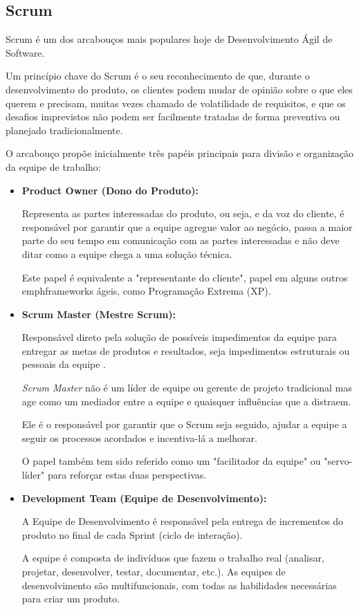 \subsection{Scrum}
\par Scrum é um dos arcabouços mais populares hoje de Desenvolvimento Ágil de Software. 
\par Um princípio chave do Scrum é o seu reconhecimento de que, durante o desenvolvimento do produto, os clientes podem mudar de opinião sobre o que eles querem e precisam, muitas vezes chamado de volatilidade de requisitos, e que os desafios imprevistos não podem ser facilmente tratadas de forma preventiva ou planejado tradicionalmente.
\par O arcabouço propõe inicialmente três papéis principais para divisão e organização da equipe de trabalho:
\begin{itemize}
\item\textbf{Product Owner (Dono do Produto):}
\par Representa as partes interessadas do produto, ou seja, e da voz do cliente, é responsável por garantir que a equipe agregue valor ao negócio, passa a maior parte do seu tempo em comunicação com as partes interessadas e não deve ditar como a equipe chega a uma solução técnica. 
\par Este papel é equivalente a "representante do cliente", papel em alguns outros emph{frameworks} ágeis, como Programação Extrema (XP).
\item\textbf{Scrum Master (Mestre Scrum):}
\par Responsável direto pela solução de possíveis impedimentos da equipe para entregar as metas de produtos e resultados, seja impedimentos estruturais ou pessoais da equipe . 
\par \emph{Scrum Master} não é um líder de equipe ou gerente de projeto tradicional mas age como um mediador entre a equipe e quaisquer influências que a distraem. 
\par Ele é o responsável por garantir que o Scrum seja seguido, ajudar a equipe a seguir os processos acordados e incentiva-lá a melhorar. 
\par O papel também tem sido referido como um "facilitador da equipe" ou "servo-líder" para reforçar estas duas perspectivas.
\item\textbf{Development Team (Equipe de Desenvolvimento):}
\par A Equipe de Desenvolvimento é responsável pela entrega de incrementos do produto no final de cada Sprint (ciclo de interação). 
\par A equipe é composta de indivíduos que fazem o trabalho real (analisar, projetar, desenvolver, testar, documentar, etc.). As equipes de desenvolvimento são multifuncionais, com todas as habilidades necessárias para criar um produto.
\end{itemize}
